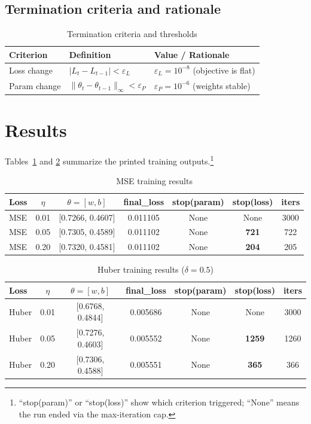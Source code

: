 \documentclass[11pt]{article}
\begin{document}
\subsection*{Termination criteria and rationale}
\begin{table}[h]
\centering
\caption{Termination criteria and thresholds}
\begin{tabular}{@{}lll@{}}
\toprule
Criterion & Definition & Value / Rationale \\
\midrule
Loss change & $|L_t-L_{t-1}|<\varepsilon_L$ & $\varepsilon_L=10^{-8}$ (objective is flat) \\
Param change & $\|\theta_t-\theta_{t-1}\|_\infty<\varepsilon_P$ & $\varepsilon_P=10^{-6}$ (weights stable) \\
\bottomrule
\end{tabular}
\end{table}

\section{Results}
Tables~\ref{tab:mse} and \ref{tab:huber} summarize the printed training outputs.\footnote{“stop(param)” or “stop(loss)” show which criterion triggered; “None” means the run ended via the max-iteration cap.}

\begin{table}[h]
\centering
\caption{MSE training results}
\label{tab:mse}
\begin{tabular}{@{}lcccccc@{}}
\toprule
Loss & $\eta$ & $\theta=[w,b]$ & final\_loss & stop(param) & stop(loss) & iters \\
\midrule
MSE & 0.01 & [0.7266, 0.4607] & 0.011105 & None & None & 3000 \\
MSE & 0.05 & [0.7305, 0.4589] & 0.011102 & None & \textbf{721} & 722 \\
MSE & 0.20 & [0.7320, 0.4581] & 0.011102 & None & \textbf{204} & 205 \\
\bottomrule
\end{tabular}
\end{table}

\begin{table}[h]
\centering
\caption{Huber training results ($\delta=0.5$)}
\label{tab:huber}
\begin{tabular}{@{}lcccccc@{}}
\toprule
Loss & $\eta$ & $\theta=[w,b]$ & final\_loss & stop(param) & stop(loss) & iters \\
\midrule
Huber & 0.01 & [0.6768, 0.4844] & 0.005686 & None & None & 3000 \\
Huber & 0.05 & [0.7276, 0.4603] & 0.005552 & None & \textbf{1259} & 1260 \\
Huber & 0.20 & [0.7306, 0.4588] & 0.005551 & None & \textbf{365} & 366 \\
\bottomrule
\end{tabular}
\end{table}
\end{document}
